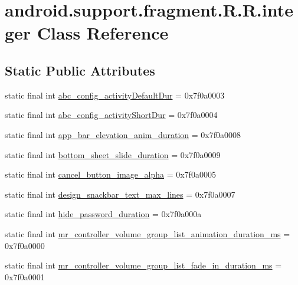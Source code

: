 \hypertarget{classandroid_1_1support_1_1fragment_1_1_r_1_1integer}{
\section{android.support.fragment.R.R.integer Class Reference}
\label{classandroid_1_1support_1_1fragment_1_1_r_1_1integer}
}
\subsection*{Static Public Attributes}
\begin{CompactItemize}
\item 
static final int \hyperlink{classandroid_1_1support_1_1fragment_1_1_r_1_1integer_8861772ed05f22eaa6bdb2cbcbb3f5df}{abc\_\-config\_\-activityDefaultDur} = 0x7f0a0003
\item 
static final int \hyperlink{classandroid_1_1support_1_1fragment_1_1_r_1_1integer_9d431171a1e26475291584c42adb36f5}{abc\_\-config\_\-activityShortDur} = 0x7f0a0004
\item 
static final int \hyperlink{classandroid_1_1support_1_1fragment_1_1_r_1_1integer_800a055f5ee2d6606eee4633c5376df1}{app\_\-bar\_\-elevation\_\-anim\_\-duration} = 0x7f0a0008
\item 
static final int \hyperlink{classandroid_1_1support_1_1fragment_1_1_r_1_1integer_df9962b324a46d54501108ccdd8811c8}{bottom\_\-sheet\_\-slide\_\-duration} = 0x7f0a0009
\item 
static final int \hyperlink{classandroid_1_1support_1_1fragment_1_1_r_1_1integer_a5bb474dacd7178b42d6fb4acc4e7206}{cancel\_\-button\_\-image\_\-alpha} = 0x7f0a0005
\item 
static final int \hyperlink{classandroid_1_1support_1_1fragment_1_1_r_1_1integer_99639123886c68f593cacc9a380849f9}{design\_\-snackbar\_\-text\_\-max\_\-lines} = 0x7f0a0007
\item 
static final int \hyperlink{classandroid_1_1support_1_1fragment_1_1_r_1_1integer_2c07789a723d085e9b829705ad8de029}{hide\_\-password\_\-duration} = 0x7f0a000a
\item 
static final int \hyperlink{classandroid_1_1support_1_1fragment_1_1_r_1_1integer_4c8a50f81f47519bf15dc99154ea75a3}{mr\_\-controller\_\-volume\_\-group\_\-list\_\-animation\_\-duration\_\-ms} = 0x7f0a0000
\item 
static final int \hyperlink{classandroid_1_1support_1_1fragment_1_1_r_1_1integer_bf16c0be6295266b65b897f04f3f0897}{mr\_\-controller\_\-volume\_\-group\_\-list\_\-fade\_\-in\_\-duration\_\-ms} = 0x7f0a0001

\end{CompactItemize}
